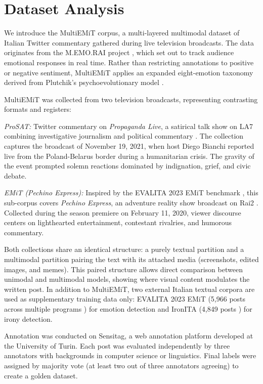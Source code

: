\section{Dataset Analysis}
\label{sec:dataset_analysis}

We introduce the MultiEMiT corpus, a multi-layered multimodal dataset of Italian Twitter commentary gathered during live television broadcasts. The data originates from the M.EMO.RAI project \cite{memorai}, which set out to track audience emotional responses in real time. Rather than restricting annotations to positive or negative sentiment, MultiEMiT applies an expanded eight-emotion taxonomy derived from Plutchik's psychoevolutionary model \cite{Plutchik}.

MultiEMiT was collected from two television broadcasts, representing contrasting formats and registers:

\textit{ProSAT:} Twitter commentary on \textit{Propaganda Live}, a satirical talk show on LA7 combining investigative journalism and political commentary \cite{propagandalive}. The collection captures the broadcast of November 19, 2021, when host Diego Bianchi reported live from the Poland-Belarus border during a humanitarian crisis. The gravity of the event prompted solemn reactions dominated by indignation, grief, and civic debate.

\textit{EMiT (Pechino Express):} Inspired by the EVALITA 2023 EMiT benchmark \cite{emit}, this sub-corpus covers \textit{Pechino Express}, an adventure reality show broadcast on Rai2 \cite{pechinoexpress}. Collected during the season premiere on February 11, 2020, viewer discourse centers on lighthearted entertainment, contestant rivalries, and humorous commentary.

Both collections share an identical structure: a purely textual partition and a multimodal partition pairing the text with its attached media (screenshots, edited images, and memes). This paired structure allows direct comparison between unimodal and multimodal models, showing where visual content modulates the written post. In addition to MultiEMiT, two external Italian textual corpora are used as supplementary training data only: EVALITA 2023 EMiT (5,966 posts across multiple programs \cite{emit}) for emotion detection and IronITA (4,849 posts \cite{ironita2018}) for irony detection.

Annotation was conducted on Sensitag, a web annotation platform developed at the University of Turin. Each post was evaluated independently by three annotators with backgrounds in computer science or linguistics. Final labels were assigned by majority vote (at least two out of three annotators agreeing) to create a golden dataset.

